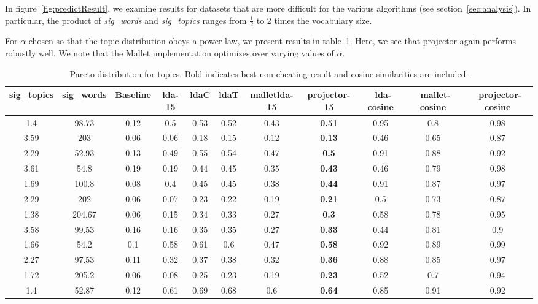 In figure~\ref{fig:predictResult}, we examine results for datasets
that are more difficult for the various algorithms (see
section~\ref{sec:analysis}).  In particular, the product of {\em
sig\_words} and {\em sig\_topics} ranges from $\frac{1}{2}$ to 2
times the vocabulary size.

For $\alpha$ chosen so that the topic distribution obeys a power
law, we present results in table~\ref{tab:pareto}. Here, we see that
projector again performs robustly well.  We note that 
the Mallet implementation optimizes over varying values of
$\alpha$. 

\begin{table}
{\small
\begin{tabular}{|c|c|c|c|c|c|c|c|c|c|c|}
\hline 
sig\_topics &sig\_words &Baseline &lda-15 &ldaC &ldaT &malletlda-15 &projector-15 &~lda-cosine &~mallet-cosine &~projector-cosine \\
 \hline 
1.4  &98.73  &{0.12}
  &{0.5}
  &{0.53}
  &{0.52}
  &{0.43}
  &\textbf{0.51}
  &0.95  &0.8  &0.98  \\
 \hline 
3.59  &203  &{0.06}
  &{0.06}
  &{0.18}
  &{0.15}
  &{0.12}
  &\textbf{0.13}
  &0.46  &0.65  &0.87  \\
 \hline 
2.29  &52.93  &{0.13}
  &{0.49}
  &{0.55}
  &{0.54}
  &{0.47}
  &\textbf{0.5}
  &0.91  &0.88  &0.92  \\
 \hline 
3.61  &54.8  &{0.19}
  &{0.19}
  &{0.44}
  &{0.45}
  &{0.35}
  &\textbf{0.43}
  &0.46  &0.79  &0.98  \\
 \hline 
1.69  &100.8  &{0.08}
  &{0.4}
  &{0.45}
  &{0.45}
  &{0.38}
  &\textbf{0.44}
  &0.91  &0.87  &0.97  \\
 \hline 
2.29  &202  &{0.06}
  &{0.07}
  &{0.23}
  &{0.22}
  &{0.19}
  &\textbf{0.21}
  &0.5  &0.73  &0.87  \\
 \hline 
1.38  &204.67  &{0.06}
  &{0.15}
  &{0.34}
  &{0.33}
  &{0.27}
  &\textbf{0.3}
  &0.58  &0.78  &0.95  \\
 \hline 
3.58  &99.53  &{0.16}
  &{0.16}
  &{0.35}
  &{0.35}
  &{0.27}
  &\textbf{0.33}
  &0.44  &0.81  &0.9  \\
 \hline 
1.66  &54.2  &{0.1}
  &{0.58}
  &{0.61}
  &{0.6}
  &{0.47}
  &\textbf{0.58}
  &0.92  &0.89  &0.99  \\
 \hline 
2.27  &97.53  &{0.11}
  &{0.32}
  &{0.37}
  &{0.38}
  &{0.32}
  &\textbf{0.36}
  &0.88  &0.85  &0.97  \\
 \hline 
1.72  &205.2  &{0.06}
  &{0.08}
  &{0.25}
  &{0.23}
  &{0.19}
  &\textbf{0.23}
  &0.52  &0.7  &0.94  \\
 \hline 
1.4  &52.87  &{0.12}
  &{0.61}
  &{0.69}
  &{0.68}
  &{0.6}
  &\textbf{0.64}
  &0.85  &0.91  &0.92  \\
 \hline 

\end{tabular}
}

\caption{Pareto distribution for topics. Bold indicates best non-cheating result
and cosine similarities are included.}
\label{tab:pareto}
\end{table}


